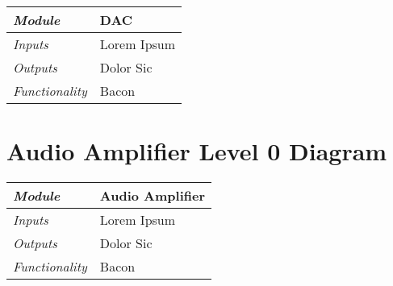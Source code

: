 \documentclass{article}
\begin{document}
\begin{tabular}{|p{1in}|p{5in}|}
\hline
\emph{Module} & DAC \\
\hline
\emph{Inputs}& Lorem Ipsum\\
\hline
\emph{Outputs}& Dolor Sic \\ 
\hline
\emph{Functionality}& Bacon\\
\hline
\end{tabular}

\section{Audio Amplifier Level 0 Diagram}

\begin{tabular}{|p{1in}|p{5in}|}
\hline
\emph{Module} & Audio Amplifier \\
\hline
\emph{Inputs}& Lorem Ipsum\\
\hline
\emph{Outputs}& Dolor Sic \\ 
\hline
\emph{Functionality}& Bacon\\
\hline
\end{tabular}
\end{document}
